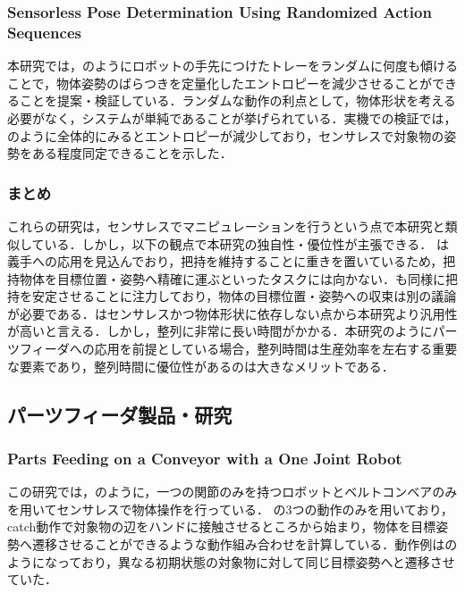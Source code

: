 \documentclass[a4paper,twoside,12pt,papersize, dvipdfmx]{iirthesis}
\begin{document}
\subsubsection{Sensorless Pose Determination Using  Randomized Action Sequences ~\cite{Mannam}}
本研究では，のようにロボットの手先につけたトレーをランダムに何度も傾けることで，物体姿勢のばらつきを定量化したエントロピーを減少させることができることを提案・検証している．ランダムな動作の利点として，物体形状を考える必要がなく，システムが単純であることが挙げられている．実機での検証では，のように全体的にみるとエントロピーが減少しており，センサレスで対象物の姿勢をある程度同定できることを示した．

\subsubsection{まとめ}
これらの研究は，センサレスでマニピュレーションを行うという点で本研究と類似している．しかし，以下の観点で本研究の独自性・優位性が主張できる．
\cite{Ospina}は義手への応用を見込んでおり，把持を維持することに重きを置いているため，把持物体を目標位置・姿勢へ精確に運ぶといったタスクには向かない．\cite{Tahara2013}\cite{Tahara2020}も同様に把持を安定させることに注力しており，物体の目標位置・姿勢への収束は別の議論が必要である．\cite{Mannam}はセンサレスかつ物体形状に依存しない点から本研究より汎用性が高いと言える．しかし，整列に非常に長い時間がかかる．本研究のようにパーツフィーダへの応用を前提としている場合，整列時間は生産効率を左右する重要な要素であり，整列時間に優位性があるのは大きなメリットである．


\subsection{パーツフィーダ製品・研究}

\subsubsection{Parts Feeding on a Conveyor with a One Joint Robot \cite{Akella}}
この研究では，のように，一つの関節のみを持つロボットとベルトコンベアのみを用いてセンサレスで物体操作を行っている．
の3つの動作のみを用いており，catch動作で対象物の辺をハンドに接触させるところから始まり，物体を目標姿勢へ遷移させることができるような動作組み合わせを計算している．動作例はのようになっており，異なる初期状態の対象物に対して同じ目標姿勢へと遷移させていた．
\end{document}
